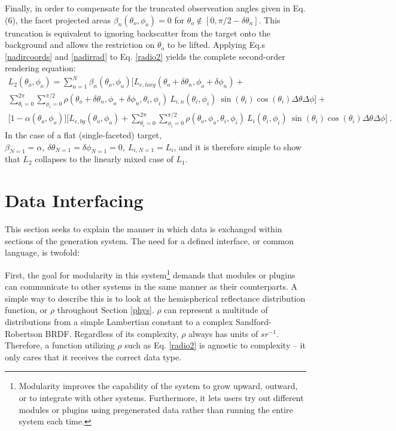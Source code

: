 \documentclass{article}
\numberwithin{equation}{section}
\begin{document}
        Finally, in order to compensate for the truncated observeation angles given in Eq. (6), the facet
        projected areas $\beta_n(\theta_o, \phi_o) = 0$ for $\theta_o \notin [0, \pi/2 - \delta\theta_n]$.
        This truncation is equivalent to ignoring backscatter from the target onto the background and allows the 
        restriction on $\theta_o$ to be lifted.
        Applying Eq.s \ref{nadircoords} and \ref{nadirrad} to Eq. \ref{radio2} yields the complete second-order
        rendering equation:
        \begin{multline}
            L_{2}(\theta_o, \phi_o) = 
                \sum_{n=1}^N \beta_{n}(\theta_o, \phi_o) \bigg[
                L_{e, targ}(\theta_{o}+\delta\theta_n, \phi_{o}+\delta\phi_n) +\\
                \sum_{\theta_i=0}^{2\pi} \sum_{\phi_i=0}^{\pi/2}
                \rho(\theta_{o}+\delta\theta_n, \phi_{o}+\delta\phi_n, \theta_i, \phi_i)\
                L_{i, n}(\theta_{i}, \phi_{i})\ \sin(\theta_i)\cos(\theta_i) \Delta\theta \Delta\phi \bigg] + \\
                \big[1 - \alpha(\theta_o, \phi_o)\big]\bigg[L_{e, bg}(\theta_o, \phi_o) +
                \sum_{\theta_i=0}^{2\pi} \sum_{\phi_i=0}^{\pi/2} \rho(\theta_o, \phi_o, \theta_i,  \phi_i)\
                L_{i}(\theta_i, \phi_i)\ \sin(\theta_i)\cos(\theta_i) \Delta\theta \Delta\phi \bigg]\ .
        \end{multline}
        In the case of a flat (single-faceted) target,
        $\beta_{N=1}=\alpha ,\ \delta\theta_{N=1}=\delta\phi_{N=1}=0 ,\ L_{i, N=1}=L_i$, and it is therefore
        simple to show that $L_2$ collapses to the linearly mixed case of $L_1$.

\section{Data Interfacing} \label{intf}

    This section seeks to explain the manner in which data is exchanged within sections of the generation
    system.
    The need for a defined interface, or common language, is twofold: 
    
    First, the goal for modularity in this system\footnote{
        Modularity improves the capability of the system to grow upward, outward, or to integrate with other
        systems.
        Furthermore, it lets users try out different modules or plugins using pregenerated data rather than
        running the entire system each time.
    } demands that modules or plugins can communicate to other systems in the same manner as their
    counterparts.
    A simple way to describe this is to look at the hemispherical reflectance distribution function, or $\rho$
    throughout Section \ref{phys}.
    $\rho$ can represent a multitude of distributions from a simple Lambertian constant to a complex
    Sandford-Robertson BRDF.
    Regardless of its complexity, $\rho$ always has units of ${sr}^{-1}$.
    Therefore, a function utilizing $\rho$ such as Eq. \ref{radio2} is agnostic to complexity -- it only cares
    that it receives the correct data type.
\end{document}

